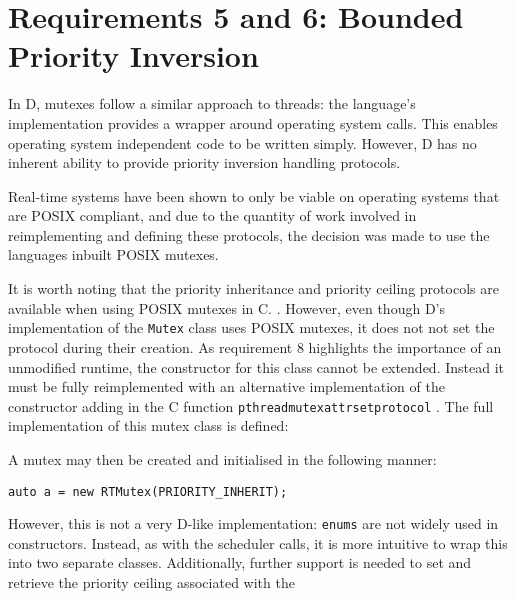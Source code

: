 \section{Requirements 5 and 6: Bounded Priority Inversion}
In D, mutexes follow a similar approach to threads: the language's
implementation provides a wrapper around operating system calls. This 
enables operating system independent code to be written simply. However, D has no 
inherent ability to provide priority inversion handling protocols. 
\par\bigskip\noindent
Real-time systems have been shown to only be viable on operating systems that 
are POSIX compliant, and due to the quantity of work involved in reimplementing 
and defining these protocols, the decision was made to use the languages
inbuilt POSIX mutexes. 
\par\bigskip\noindent
It is worth noting that the priority inheritance and priority ceiling protocols 
are available when using POSIX mutexes in C. 
\cite{mutex-setprotocol}. However, even though D's implementation of the \texttt{Mutex} 
class uses POSIX mutexes, it does not not set the protocol during their creation. 
As requirement 8 highlights the importance of an unmodified runtime, the 
constructor for this class cannot be extended. Instead it must be fully 
reimplemented with an alternative implementation of the constructor adding in 
the C function \texttt{pthread\textunderscore{}mutexattr\textunderscore{}setprotocol} \cite{mutex-setprotocol}. 
The full implementation of this mutex class is defined:

A mutex may then be created and initialised in the following manner: 
\begin{lstlisting}[basicstyle=\small]
auto a = new RTMutex(PRIORITY_INHERIT);
\end{lstlisting}
However, this is not a very D-like implementation: \texttt{enums} are not widely used 
in constructors. Instead, as with the scheduler calls, 
it is more intuitive to wrap this into two separate classes. Additionally, 
further support 
is needed to set and retrieve the priority ceiling associated with the 
